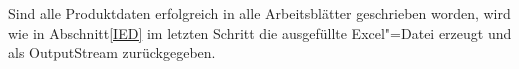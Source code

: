 Sind alle Produktdaten erfolgreich in alle Arbeitsblätter geschrieben worden, wird wie in Abschnitt\nbs\ref{IED} im letzten Schritt die ausgefüllte Excel"=Datei erzeugt und als OutputStream zurückgegeben. 




























